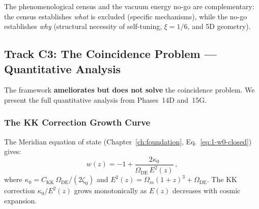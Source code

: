 The phenomenological census and the vacuum energy no-go are complementary: the census establishes \emph{what} is excluded (specific mechanisms), while the no-go establishes \emph{why} (structural necessity of self-tuning, $\xi = 1/6$, and 5D geometry).



\subsection{Track C3: The Coincidence Problem --- Quantitative Analysis}
\label{app:coincidence}

The framework \textbf{ameliorates but does not solve} the coincidence problem. We present the full quantitative analysis from Phases~14D and~15G.

\subsubsection{The KK Correction Growth Curve}

The Meridian equation of state (Chapter~\ref{ch:foundation}, Eq.~\ref{eq:1-w0-closed}) gives:
\begin{equation}
  w(z) = -1 + \frac{2\kappa_0}{\Omega_{\mathrm{DE}}\,E^2(z)}\,,
  \label{eq:app-coinc-wz}
\end{equation}
where $\kappa_0 = C_\mathrm{KK}\,\Omega_{\mathrm{DE}}/(2\zeta_0)$ and $E^2(z) = \Omega_m(1+z)^3 + \Omega_{\mathrm{DE}}$. The KK correction $\kappa_0/E^2(z)$ grows monotonically as $E(z)$ decreases with cosmic expansion.

